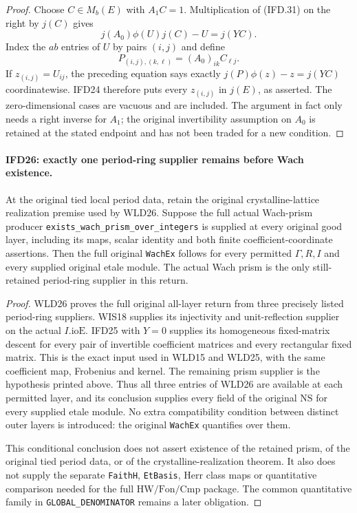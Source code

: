 \documentclass[11pt,a4paper]{article}
\numberwithin{equation}{section}
\theoremstyle{remark}\newtheorem{remark}[theorem]{Remark}
\begin{document}
\begin{proof}
Choose $C\in M_b(E)$ with $A_1C=1$. Multiplication of (IFD.31)
on the right by $j(C)$ gives
\[
                   j(A_0)\phi(U)j(C)-U=j(YC).
\]
Index the $ab$ entries of $U$ by pairs $(i,j)$ and define
\[
               P_{(i,j),(k,\ell)}=(A_0)_{ik}C_{\ell j}.
\]
If $z_{(i,j)}=U_{ij}$, the preceding equation says exactly
$j(P)\phi(z)-z=j(YC)$ coordinatewise. IFD24 therefore puts
every $z_{(i,j)}$ in $j(E)$, as asserted.
The zero-dimensional cases are vacuous and are included.
The argument in fact only needs a right inverse for $A_1$;
the original invertibility assumption on $A_0$ is retained at
the stated endpoint and has not been traded for a new condition.
\end{proof}

\paragraph{IFD26: exactly one period-ring supplier remains before Wach existence.}
\label{claim:IFD26}
At the original tied local period data, retain the original
crystalline-lattice realization premise used by WLD26.
Suppose the full actual Wach-prism producer
\texttt{exists\_\allowbreak wach\_\allowbreak prism\_\allowbreak over\_\allowbreak integers} is supplied at every
original good layer, including its maps, scalar identity and both
finite coefficient-coordinate assertions.
Then the full original \texttt{Wach\allowbreak Ex} follows for every permitted
$\Gamma,R,I$ and every supplied original etale module.
The actual Wach prism is the only still-retained period-ring
supplier in this return.

\begin{proof}
WLD26 proves the full original all-layer return from three precisely
listed period-ring suppliers. WIS18 supplies its injectivity and
unit-reflection supplier on the actual $I.\mathrm{ioE}$.
IFD25 with $Y=0$ supplies its homogeneous fixed-matrix descent
for every pair of invertible coefficient matrices and every
rectangular fixed matrix. This is the exact input used in WLD15
and WLD25, with the same coefficient map, Frobenius and kernel.
The remaining prism supplier is the hypothesis printed above.
Thus all three entries of WLD26 are available at each permitted
layer, and its conclusion supplies every field of the original
$\mathrm{NS}$ for every supplied etale module.
No extra compatibility condition between distinct outer layers
is introduced: the original \texttt{Wach\allowbreak Ex} quantifies over them.

This conditional conclusion does not assert existence of the
retained prism, of the original tied period data, or of the
crystalline-realization theorem. It also does not supply the
separate \texttt{Faith\allowbreak H}, \texttt{Et\allowbreak Basis}, Herr class maps or
quantitative comparison needed for the full $\mathrm{HW/Fon/Cmp}$
package. The common quantitative family in
\texttt{GLOBAL\_\allowbreak DENOMINATOR} remains a later obligation.
\end{proof}
\end{document}
